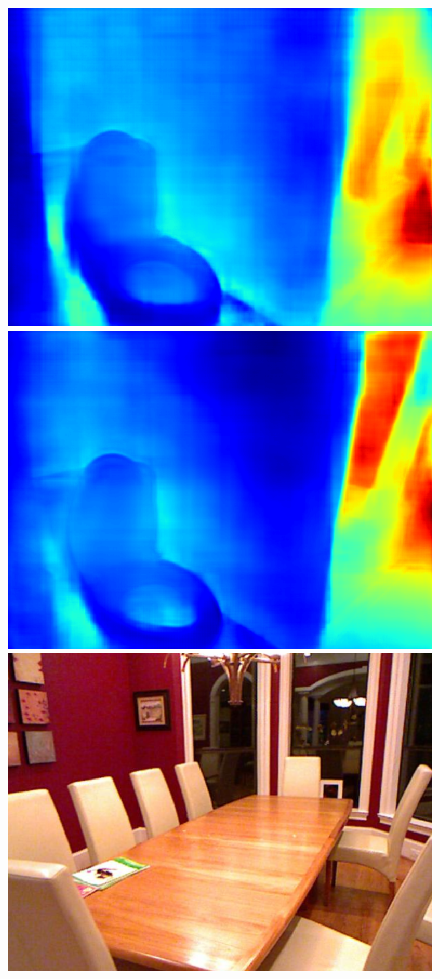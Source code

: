 \documentclass{svjour3}                     %
\begin{document}
\begin{figure}[t]
{\begin{minipage}[t]{0.15\linewidth}
  \includegraphics[width=1\linewidth]{images/nyu_result/bathroom_rgb_00706.png}
  \includegraphics[width=1\linewidth]{images/nyu_without/bathroom_rgb_00706.png}
  \includegraphics[width=1\linewidth]{images/nyu_rgb/1399.png}

\end{minipage}}
\end{figure}
\end{document}

